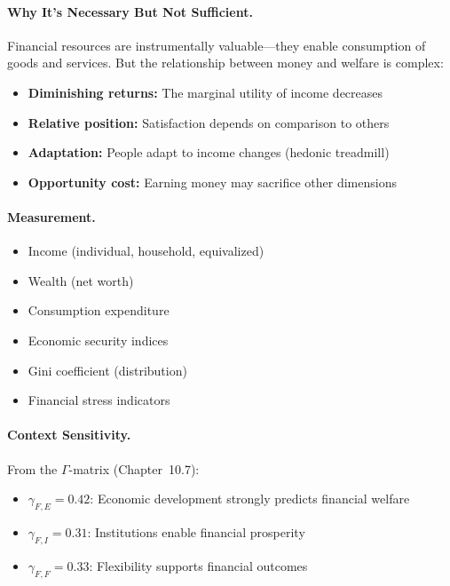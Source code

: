 \paragraph{Why It's Necessary But Not Sufficient.}
Financial resources are instrumentally valuable---they enable consumption 
of goods and services. But the relationship between money and welfare 
is complex:

\begin{itemize}
\item \textbf{Diminishing returns:} The marginal utility of income decreases
\item \textbf{Relative position:} Satisfaction depends on comparison to others
\item \textbf{Adaptation:} People adapt to income changes (hedonic treadmill)
\item \textbf{Opportunity cost:} Earning money may sacrifice other dimensions
\end{itemize}

\paragraph{Measurement.}
\begin{itemize}
\item Income (individual, household, equivalized)
\item Wealth (net worth)
\item Consumption expenditure
\item Economic security indices
\item Gini coefficient (distribution)
\item Financial stress indicators
\end{itemize}

\paragraph{Context Sensitivity.}
From the $\Gamma$-matrix (Chapter~10.7):
\begin{itemize}
\item $\gamma_{F,E} = 0.42$: Economic development strongly predicts financial welfare
\item $\gamma_{F,I} = 0.31$: Institutions enable financial prosperity
\item $\gamma_{F,F} = 0.33$: Flexibility supports financial outcomes
\end{itemize}

